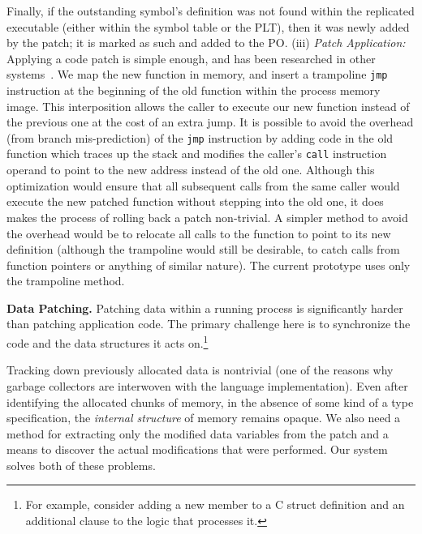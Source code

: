 Finally, if the outstanding symbol's definition was not found within
the replicated executable (either within the symbol table or the PLT),
then it was newly added by the patch; it is marked as such and added
to the PO.
\newline
(iii) {\it Patch Application:} Applying a code patch is simple enough,
and has been researched in other
systems~\cite{pannus,livepatch,ksplice,kaho}.  We map the new function
in memory, and insert a trampoline {\tt jmp} instruction at the
beginning of the old function within the process memory image. This
interposition allows the caller to execute our new function instead of
the previous one at the cost of an extra jump.  It is possible to
avoid the overhead (from branch mis-prediction) of the {\tt jmp}
instruction by adding code in the old function which traces up the
stack and modifies the caller's {\tt call} instruction operand to
point to the new address instead of the old one. Although this
optimization would ensure that all subsequent calls from the same
caller would execute the new patched function without stepping into
the old one, it does makes the process of rolling back a patch
non-trivial. A simpler method to avoid the overhead would be to
relocate all calls to the function to point to its new definition
(although the trampoline would still be desirable, to catch calls from
function pointers or anything of similar nature). The current
prototype uses only the trampoline method.

{\bf Data Patching.} %
Patching data within a running process is significantly harder than
patching application code.  The primary challenge here is to
synchronize the code and the data structures it acts on.\footnote{For
  example, consider adding a new member to a C struct definition and
  an additional clause to the logic that processes it.}

Tracking down previously allocated data is nontrivial (one of the
reasons why garbage collectors are interwoven with the language
implementation).  Even after identifying the allocated chunks of
memory, in the absence of some kind of a type specification, the {\it
  internal structure} of memory remains opaque.  We also need a method
for extracting only the modified data variables from the patch and a
means to discover the actual modifications that were performed. 
Our system solves both of these problems.

